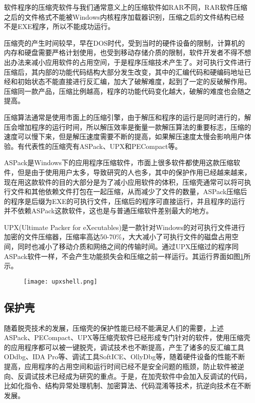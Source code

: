 软件程序的压缩壳软件与我们通常意义上的压缩软件如RAR不同，RAR软件压缩之后的文件格式不能被Windows内核程序加载器识别，压缩之后的文件结构已经不是EXE程序，所以不能成功运行。

压缩壳的产生时间较早，早在DOS时代，受到当时的硬件设备的限制，计算机的内存和硬盘需要严格计划使用，也受到移动存储介质的限制，软件开发者不得不想出办法来减小应用软件的占用空间，于是程序压缩技术产生了。对可执行文件进行压缩后，其内部的功能代码结构大部分发生改变，其中的汇编代码和硬编码地址已经和初始状态不能直接进行反汇编，加大了破解难度，起到了一定的反破解作用。压缩同一款产品，压缩比例越高，程序的功能代码变化越大，破解的难度也会随之提高。

压缩算法通常是使用市面上的压缩引擎，由于解压和程序的运行是同时进行的，解压会增加程序的运行时间，所以解压效率是衡量一款解压算法的重要标志，压缩的速度可以慢下来，但是解压速度需要不断的提高，如果解压速度太慢会影响用户体验。有代表性的压缩壳有ASPack、UPX和PECompact等。

ASPack是Windows下的应用程序压缩软件，市面上很多软件都使用这款压缩软件，但是由于使用用户太多，导致研究的人也多，其中的保护作用已经越来越来，现在用这款软件的目的大部分是为了减小应用软件的体积，压缩壳通常可以将可执行文件和其他依赖文件打包在一起压缩，从而减少了文件的数量，ASPack压缩后的程序是后缀为EXE的可执行文件，压缩后的程序可直接运行，并且程序的运行并不依赖ASPack这款软件，这也是与普通压缩软件差别最大的地方。

UPX(Ultimate Packer for eXecutables)是一款针对Windows的对可执行文件进行加密的文件压缩器，压缩率高达50-70$\%$，大大减小了可执行文件的磁盘占用空间，同时也减小了移动介质和网络之间的传输时间。通过UPX压缩过的程序同ASPack软件一样，不会产生功能损失会和压缩之前一样运行。其运行界面如图\ref{sec2:subsec3:upxshell}所示。

\begin{figure}[htbp]
	\centering
	\texttt{[image: upxshell.png]}\\
	\label{sec2:subsec3:upxshell}
\end{figure}

\subsection{保护壳}
\label{cha3:sec:protectshell}
随着脱壳技术的发展，压缩壳的保护性能已经不能满足人们的需要，上述ASPack、PECompact、UPX等压缩壳软件已经形成专门针对的软件，使用压缩壳的应用程序都可以被一键脱壳，调试技术也不断提高，产生了诸多的反汇编工具ODdbg、IDA Pro等、调试工具SoftICE、OllyDbg等，随着硬件设备的性能不断提高，应用程序的占用空间和运行时间已经不是安全问题的瓶颈，防止软件被逆向、反调试技术已经成为研究的重点。于是，在加壳软件中会加入反调试的代码，比如化指令、结构异常处理机制、加密算法、代码混淆等技术，抗逆向技术在不断发展。

